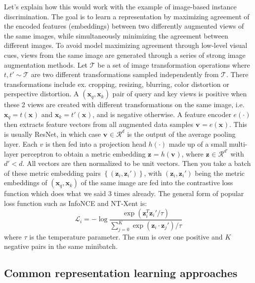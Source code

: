 Let's explain how this would work with the example of image-based instance discrimination.
The goal is to learn a representation by maximizing agreement of the encoded features (embeddings)
between two differently augmented views of the same images,
while simultaneously minimizing the agreement between different images.
To avoid model maximizing agreement through low-level visual cues, views
from the same image are generated through a series of strong image augmentation methods.
Let $ \mathcal{T}  $ be a set of image transformation operations where
$ t, t' \sim \mathcal{T}  $ are two different transformations sampled independently from $ \mathcal{T}  $.
There transformations include ex. cropping, resizing, blurring, color distortion or perspective distortion.
A $ (\bm{x}_{q}, \bm{x}_{k})  $ pair of query and key views is positive when these 2 views
are created with different transformations on the same image,
i.e. $ \bm{x}_{q} = t (\bm{x}_{})  $ and $ \bm{x}_{k} = t' (\bm{x}_{})  $,
and is negative otherwise.
A feature encoder $ e (\cdot)  $ then extracts feature vectors from all augmented data samples 
$ \bm{v}_{} = e (\bm{x}_{})  $. This is usually ResNet, in which case 
$ \bm{v}_{} \in \mathcal{R}^{ d }  $ is the output of the average pooling layer.
Each $ v  $ is then fed into a projection head $ h (\cdot)  $ made up of
a small multi-layer perceptron to obtain a metric embedding $ \bm{z}_{} = h (\bm{v}_{})  $,
where $ \bm{z}_{} \in \mathcal{R}^{ d' }  $ with $ d' < d  $.
All vectors are then normalized to be unit vectors.
Then you take a batch of these metric embedding pairs $ \left\{ (\bm{z}_{i}, \bm{z}_{i}') \right\}   $,
with $ (\bm{z}_{i}, \bm{z}_{i}')  $ being the metric embeddings of
$ (\bm{x}_{q}, \bm{x}_{k})  $ of the same image
are fed into the contrastive loss function which does what we said 3 times already.
The general form of popular loss function such as InfoNCE and NT-Xent
is:
\begin{equation}
		\mathcal{L}_{ i } = - \log \frac{\exp (\bm{z}_{i}^{ T }\bm{z}_{i}'/\tau)}{\sum_{j=0}^{K} \exp (\bm{z}_{i} \cdot \bm{z}_{j}')/\tau} 
\end{equation}
where $ \tau  $ is the temperature parameter.
The sum is over one positive and $ K  $ negative pairs in the same minibatch.


\subsection{Common representation learning approaches}
